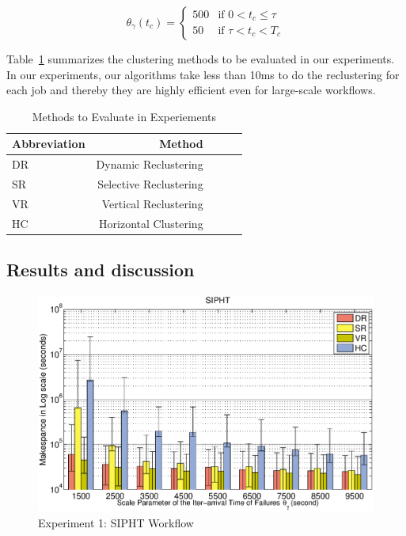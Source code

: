 \documentclass{IOS-Book-Article}
\begin{document}
\begin{equation}
\label{eq:pulse_function}
 \theta_{\gamma}(t_c) =
  \begin{cases}
   500 & \text{if } 0< t_c \leq \tau \\
   50       & \text{if } \tau< t_c < T_c
  \end{cases}
\end{equation}

Table~\ref{tab:evaluation_methods} summarizes the clustering methods to be evaluated in our experiments. In our experiments, our algorithms take less than 10ms to do the reclustering for each job and thereby they are highly efficient even for large-scale workflows. 
\begin{table}[!htb]
	\centering
	\small
	\begin{tabular}{l|rrrr}
		\hline
		Abbreviation	& Method	  \\
		\hline
		DR 		& Dynamic Reclustering		\\
		SR 		&Selective Reclustering\\
		VR 	&Vertical Reclustering\\
		HC 	&Horizontal Clustering \\
		\hline
	\end{tabular}
	\caption{Methods to Evaluate in Experiements}
	\label{tab:evaluation_methods}
\end{table} 


\subsection{Results and discussion}
\label{sec:results}

\begin{figure}[!htb]
\centering
  \includegraphics[width=1\linewidth]{sipht.eps}
  \caption{Experiment 1: SIPHT Workflow}
  \label{fig:expr_sipht}
\end{figure}
\end{document}
